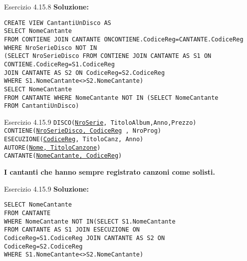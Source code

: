 \begin{frame}{Esercizio 4.15.8}
    \textbf{Soluzione:}
    \vspace{1em}
    
    \texttt{CREATE VIEW CantantiUnDisco AS
\\SELECT NomeCantante
\\FROM CONTIENE JOIN CANTANTE ONCONTIENE.CodiceReg=CANTANTE.CodiceReg\\WHERE NroSerieDisco NOT IN
\\(SELECT NroSerieDisco
FROM CONTIENE JOIN CANTANTE AS S1 ON
CONTIENE.CodiceReg=S1.CodiceReg\\JOIN CANTANTE AS S2 ON CodiceReg=S2.CodiceReg\\WHERE S1.NomeCantante<>S2.NomeCantante)\\
\vspace{1em}
SELECT NomeCantante\\FROM CANTANTE
WHERE NomeCantante NOT IN (SELECT NomeCantante\\FROM CantantiUnDisco)}
    \end{frame}
\begin{frame}{Esercizio 4.15.9}
    \texttt{DISCO(\underline{NroSerie}, TitoloAlbum,Anno,Prezzo)\\
    CONTIENE(\underline{NroSerieDisco, CodiceReg} , NroProg)\\
    ESECUZIONE(\underline{CodiceReg}, TitoloCanz, Anno)\\
    AUTORE(\underline{Nome, TitoloCanzone})\\
    CANTANTE(\underline{NomeCantante, CodiceReg})}
    \vspace{1em}
    
    \textbf{I cantanti che hanno sempre registrato canzoni come solisti.}
\end{frame}

\begin{frame}{Esercizio 4.15.9}
    \textbf{Soluzione:}
    \vspace{1em}
    
    \texttt{SELECT NomeCantante\\FROM CANTANTE\\WHERE NomeCantante NOT IN(SELECT S1.NomeCantante\\\hspace{13em}FROM CANTANTE AS S1 JOIN ESECUZIONE ON\\\hspace{12,5em} CodiceReg=S1.CodiceReg JOIN CANTANTE AS S2 ON\\\hspace{12,5em} CodiceReg=S2.CodiceReg\\\hspace{13em}WHERE S1.NomeCantante<>S2.NomeCantante)}
    \end{frame}

